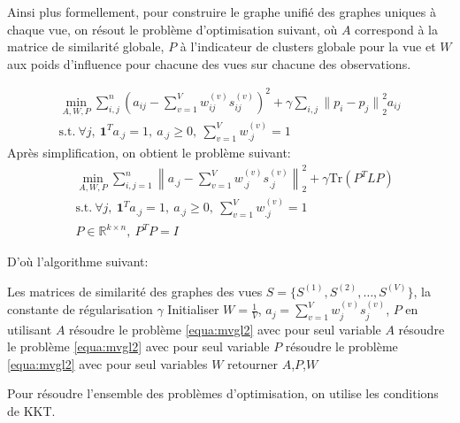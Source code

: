 \documentclass[12pt, french, latin.medieval, a4paper]{report}
\begin{document}
    Ainsi plus formellement, pour construire le graphe unifié des graphes uniques à chaque vue, on résout le problème d'optimisation suivant, où
    $A$ correspond à la matrice de similarité globale,
	$P$ à l'indicateur de clusters globale pour la vue et
    $W$ aux poids d'influence pour chacune des vues sur chacune des observations.

	\begin{equation*}
   	 \begin{aligned}
   		 \min_{A,W,P} \sum_{i,j}^n {\left( a_{ij} - \sum_{v=1}^V w_{ij}^{(v)}s_{ij}^{(v)}\right)}^2 + \gamma \sum_{i,j} {\|p_i-p_j\|}_2^2a_{ij}
        	\\ \text{s.t.}\ \forall j,\ \textbf{1}^Ta_{.j} = 1,\ a_{.j}\geq0,\ \sum_{v=1}^V w_{.j}^{(v)} = 1
    	\end{aligned}
    \end{equation*}
	Après simplification, on obtient le problème suivant:
	\begin{equation}
   	 \begin{aligned}
   		 & \min_{A,W,P} \sum_{i,j=1}^n {\left\| a_{.j} - \sum_{v=1}^V w_{.j}^{(v)}s_{.j}^{(v)}\right\|}_2^2 + \gamma \text{Tr}(P^TLP)
        	\\ & \text{s.t.}\ \forall j,\ \textbf{1}^Ta_{.j} = 1,\ a_{.j}\geq0,\ \sum_{v=1}^V w_{.j}^{(v)} = 1
        	\\ & P \in \mathbb{R}^{k \times n} ,\ P^TP = I
    	\end{aligned}
   	 \label{equa:mvgl2}
    \end{equation}
    
	D'où l'algorithme suivant:
    \begin{algorithm}[H]
    	\caption{Algorithme d'apprentissage du graphe globale \cite{zhan2017graph} }
    	\label{alg:mcles1}
    	\begin{algorithmic}[1]
    	\REQUIRE Les matrices de similarité des graphes des vues $S = \{ S^{(1)}, S^{(2)},\dots,S^{(V)} \}$, la constante de régularisation $\gamma$
    	\STATE Initialiser $W = \frac{1}{V}$, $a_j = \sum_{v=1}^V w_j^{(v)}s_j^{(v)}$, $P$ en utilisant $A$
        	\REPEAT
            	\STATE résoudre le problème \ref{equa:mvgl2} avec pour seul variable $A$
            	\STATE résoudre le problème \ref{equa:mvgl2} avec pour seul variable $P$
   	   	\STATE résoudre le problème \ref{equa:mvgl2} avec pour seul variables $W$
    	\ENDWHILE
    	\STATE retourner $A$,$P$,$W$
    	\end{algorithmic}
	\end{algorithm}
	Pour résoudre l'ensemble des problèmes d'optimisation, on utilise les conditions de KKT.
\end{document}
